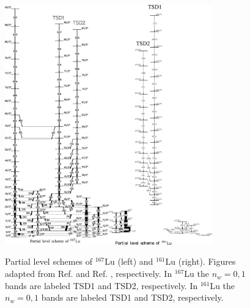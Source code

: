\begin{figure}[ht!]
\centerline{\includegraphics[width=0.4\textwidth]{./img/c1/167Lu_scheme.png}\hspace{0.1\textwidth}\includegraphics[width=0.4\textwidth]{./img/c1/161Lu_scheme.png}}
	\caption{Partial level schemes of $^{167}$Lu (left) and $^{161}$Lu (right). Figures adapted from Ref. \cite{wobblingIn167Lu} and Ref. \cite{wobblingIn161Lu}, respectively. In $^{167}$Lu the $n_w=0,1$ bands are labeled TSD1 and TSD2, respectively. In $^{161}$Lu the $n_w=0,1$ bands are labeled TSD1 and TSD2, respectively.\label{fig:chp1-second-wobb}}
\end{figure}

